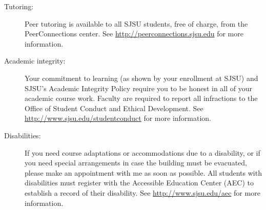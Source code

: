 \documentclass[letterpaper,12pt,fleqn]{article}
\begin{document}
\begin{description}
\item[Tutoring:] Peer tutoring is available to all SJSU students, free of
    charge, from the PeerConnections center. See
    \url{http://peerconnections.sjsu.edu} for more information.

\item[Academic integrity:] Your commitment to learning (as shown by your
    enrollment at SJSU) and SJSU's Academic Integrity Policy require you to be
    honest in all of your academic course work.  Faculty are required to report
    all infractions to the Office of Student Conduct and Ethical Development.
    See \url{http://www.sjsu.edu/studentconduct} for more information.

\item[Disabilities:] If you need course adaptations or accommodations due to a
    disability, or if you need special arrangements in case the building must
    be evacuated, please make an appointment with me as soon as possible. All
    students with disabilities must register with the Accessible Education
    Center (AEC) to establish a record of their disability. See
    \url{http://www.sjsu.edu/aec} for more information.

\end{description}
\end{document}
